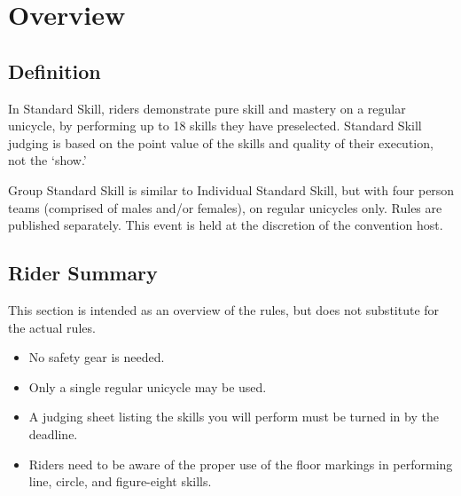 \chapter{Overview}

\section{Definition}

In Standard Skill, riders demonstrate pure skill and mastery on a regular unicycle, by performing up to 18 skills they have preselected.
Standard Skill judging is based on the point value of the skills and quality of their execution, not the `show.'

Group Standard Skill is similar to Individual Standard Skill, but with four person teams (comprised of males and/or females), on regular unicycles only.
Rules are published separately.
This event is held at the discretion of the convention host.

\section{Rider Summary}

This section is intended as an overview of the rules, but does not
substitute for the actual rules.
\begin{itemize}
\item No safety gear is needed.
\item Only a single regular unicycle may be used.
\item A judging sheet listing the skills you will perform must be turned in by the deadline.
\item Riders need to be aware of the proper use of the floor markings in performing line, circle, and figure-eight skills.
\end{itemize}
